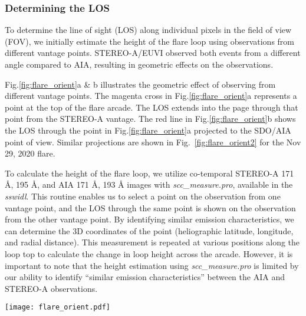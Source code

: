 \subsubsection{Determining the LOS}\label{sec:los}

To determine the line of sight (LOS) along individual pixels in the field of view (FOV), we initially estimate the height of the flare loop using observations from different vantage points. STEREO-A/EUVI observed both events from a different angle compared to AIA, resulting in geometric effects on the observations.

Fig.\ref{fig:flare_orient}a & b illustrates the geometric effect of observing from different vantage points. The magenta cross in Fig.\ref{fig:flare_orient}a represents a point at the top of the flare arcade. The LOS extends into the page through that point from the STEREO-A vantage. The red line in Fig.\ref{fig:flare_orient}b shows the LOS through the point in Fig.\ref{fig:flare_orient}a projected to the SDO/AIA point of view. Similar projections are shown in Fig.~\ref{fig:flare_orient2} for the Nov 29, 2020 flare.

To calculate the height of the flare loop, we utilize co-temporal STEREO-A 171 {\AA}, 195 {\AA}, and AIA 171 {\AA}, 193 {\AA} images with \textit{scc\_measure.pro}, available in the \textit{sswidl}. This routine enables us to select a point on the observation from one vantage point, and the LOS through the same point is shown on the observation from the other vantage point. By identifying similar emission characteristics, we can determine the 3D coordinates of the point (heliographic latitude, longitude, and radial distance). This measurement is repeated at various positions along the loop top to calculate the change in loop height across the arcade. However, it is important to note that the height estimation using \textit{scc\_measure.pro} is limited by our ability to identify ``similar emission characteristics'' between the AIA and STEREO-A observations.

\begin{figure*}[ht!]
    \centering
    \texttt{[image: flare\_orient.pdf]}
    \caption{Panel (a): {\it STEREO-A}/EUVI 171 {\AA} observation of the flare arcade in the decay phase. The magenta cross marks a point on the top of the arcade. The LOS goes into the page through that point. Panel (b): SDO/AIA 171 {\AA} observation of the flare arcade. The red line marks the LOS through the arcade from the STEREO-A perspective projected to the AIA perspective.}
    \label{fig:flare_orient}
\end{figure*}

